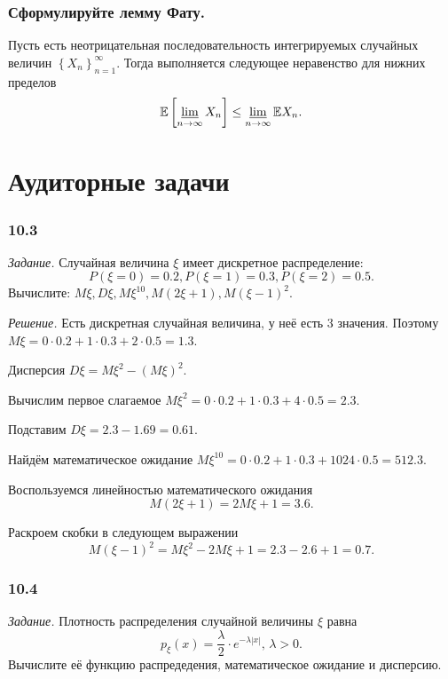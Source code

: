 \subsubsection*{Сформулируйте лемму Фату.}

Пусть есть неотрицательная последовательность интегрируемых случайных величин $ \left\{ X_n \right\}_{n=1}^{ \infty }$.
Тогда выполняется следующее неравенство для нижних пределов
$$ \mathbb{E} \left[ \varliminf \limits_{n \to \infty } X_n \right] \leq \varliminf \limits_{n \to \infty } \mathbb{E}X_n.$$

\section*{Аудиторные задачи}

\subsubsection*{10.3}

\textit{Задание.}
Случайная величина $ \xi $ имеет дискретное распределение:
$$P \left( \xi = 0 \right) = 0.2,
P \left( \xi = 1 \right) = 0.3,
P \left( \xi = 2 \right) = 0.5.$$
Вычислите:
$M \xi, D \xi, M \xi^{10}, M \left( 2 \xi + 1 \right),
  M \left( \xi - 1 \right)^2$.

\textit{Решение.} Есть дискретная случайная величина, у неё есть 3 значения.
Поэтому $M \xi = 0 \cdot 0.2 + 1 \cdot 0.3 + 2 \cdot 0.5 = 1.3$.

Дисперсия $D \xi = M \xi^2 - \left( M \xi \right)^2$.

Вычислим первое слагаемое
$M \xi^2 = 0 \cdot 0.2 + 1 \cdot 0.3 + 4 \cdot 0.5 = 2.3$.

Подставим $D \xi = 2.3 - 1.69 = 0.61$.

Найдём математическое ожидание
$M \xi^{10} = 0 \cdot 0.2 + 1 \cdot 0.3 + 1024 \cdot 0.5 = 512.3$.

Воспользуемся линейностью математического ожидания
$$M \left( 2 \xi + 1 \right) =
2 M \xi + 1 =
3.6.$$

Раскроем скобки в следующем выражении
$$M \left( \xi - 1 \right)^2 =
M \xi^2 - 2 M \xi + 1 =
2.3 - 2.6 + 1 =
0.7.$$

\subsubsection*{10.4}

\textit{Задание.} Плотность распределения случайной величины $ \xi $ равна
$$p_{ \xi } \left( x \right) =
\frac{ \lambda }{2} \cdot e^{- \lambda \left| x \right| }, \, \lambda > 0.$$
Вычислите её функцию распредедения, математическое ожидание и дисперсию.

